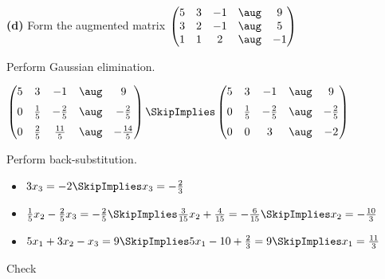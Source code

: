 \documentclass[oneside,12pt]{amsart}
\begin{document}
\bigskip


\textbf{(d)} Form the augmented matrix
$
\begin{pmatrix}
  5 & 3 &  -1 & \aug &  9  \\
  3 & 2 &  -1 & \aug &  5  \\
  1 & 1 &   2 & \aug & -1  \\
\end{pmatrix}
$

Perform Gaussian elimination.

\bigskip

$
\begin{pmatrix}
 5 & 3           &  -1            & \aug &    9            \\[6pt]
 0 & \frac{1}{5} &  - \frac{2}{5} & \aug &  - \frac{2}{5}  \\[6pt]
 0 & \frac{2}{5} &   \frac{11}{5} & \aug &   -\frac{14}{5} \\
\end{pmatrix}
\SkipImplies
\begin{pmatrix}
 5 & 3           &  -1            & \aug &    9            \\[6pt]
 0 & \frac{1}{5} &  - \frac{2}{5} & \aug &   -\frac{2}{5}  \\[6pt]
 0 & 0           &   3            & \aug &   -2            \\
\end{pmatrix}
$

\bigskip

Perform back-substitution.

\begin{itemize}
\item $3x_3=-2  \SkipImplies x_3 = -\frac{2}{3}$
\item $\frac{1}{5}x_2 -  \frac{2}{5} x_3 =  -\frac{2}{5} \SkipImplies \frac{3}{15}x_2 +  \frac{4}{15} =  -\frac{6}{15} \SkipImplies x_2 = -\frac{10}{3}$
\item $5x_1 +3x_2 -x_3 = 9 \SkipImplies 5x_1 -10 + \frac{2}{3} = 9 \SkipImplies x_1 = \frac{11}{3}$
\end{itemize}

\bigskip

Check

\bigskip
\end{document}
